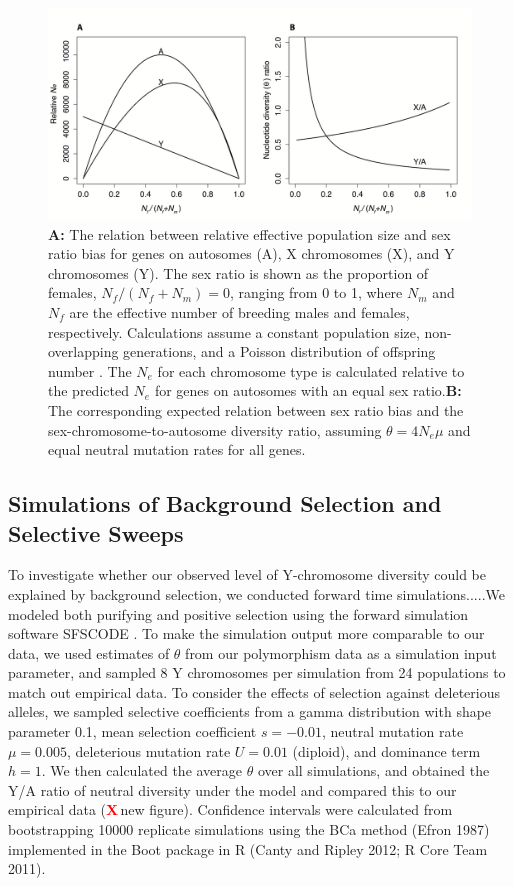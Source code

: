\documentclass[9pt,twocolumn,twoside]{gsajnl}
\newcommand{\X}{\textcolor{red}{\bf X\,}}
\begin{document}
\begin{figure}[htbp]
\centering
\includegraphics[width=\linewidth]{Figure1.png}
\caption{\textbf{A:} The relation between relative effective population size and sex ratio bias for genes on autosomes (A), X chromosomes (X), and Y chromosomes (Y). The sex ratio is shown as the proportion of females, $N_{f}/(N_{f}+N_{m})=0$, ranging from 0 to 1, where $N_{m}$ and $N_{f}$ are the effective number of breeding males and females, respectively. Calculations assume a constant population size, non-overlapping generations, and a Poisson distribution of offspring number \citep{wright1931evolution,charlesworth2009effective}. The $N_{e}$ for each chromosome type is calculated relative to the predicted $N_{e}$ for genes on autosomes with an equal sex ratio.\textbf{B:} The corresponding expected relation between sex ratio bias and the sex-chromosome-to-autosome diversity ratio, assuming $\theta=4N_{e}\mu$ and equal neutral mutation rates for all genes.
}%
\label{fig:spectrum}
\end{figure}

\subsection*{Simulations of Background Selection and Selective Sweeps}
To investigate whether our observed level of Y-chromosome diversity could be explained by background selection, we conducted forward time simulations.....We modeled both purifying and positive selection using the forward simulation software SFSCODE \citep{hernandez2008flexible}. To make the simulation output more comparable to our data, we used estimates of $\theta$ from our polymorphism data as a simulation input parameter, and sampled 8 Y chromosomes per simulation from 24 populations to match out empirical data. To consider the effects of selection against deleterious alleles, we sampled selective coefficients from a gamma distribution with shape parameter 0.1, mean selection coefficient $s=-0.01$, neutral mutation rate $\mu = 0.005$, deleterious mutation rate $U=0.01$ (diploid), and dominance term $h=1$. We then calculated the average $\theta$ over all simulations, and obtained the Y/A ratio of neutral diversity under the model and compared this to our empirical data (\X new figure). Confidence intervals were calculated from bootstrapping 10000 replicate simulations  using the BCa method (Efron 1987) implemented in the Boot package in R (Canty and Ripley 2012; R Core Team 2011). 
\end{document}
